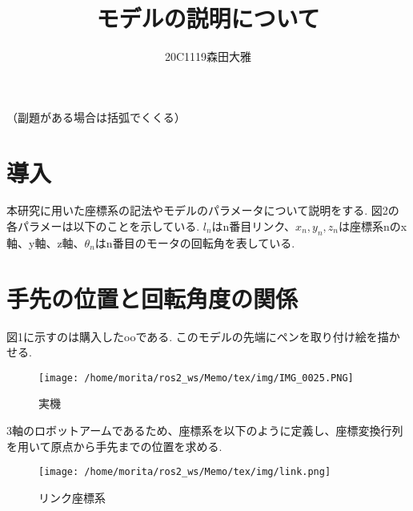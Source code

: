 \documentclass[10pt]{jarticle}
\begin{document}
    
    \makeatletter
    \title{モデルの説明について}{（副題がある場合は括弧でくくる）}
    
    \author{20C1119\hspace{.5zw}森田大雅}
    
    \makeatother
    
    \maketitle
    
  
    \section{導\hspace{2zw}入}%
	本研究に用いた座標系の記法やモデルのパラメータについて説明をする.
	図2の各パラメーは以下のことを示している.
	$l_n$はn番目リンク、$x_n, y_n, z_n$は座標系nのx軸、y軸、z軸、$\theta_n$はn番目のモータの回転角を表している.

	\section{手先の位置と回転角度の関係}
	図1に示すのは購入したooである. 
	このモデルの先端にペンを取り付け絵を描かせる.
	\begin{center}
	        \begin{figure}[!b]
	            \texttt{[image: /home/morita/ros2\_ws/Memo/tex/img/IMG\_0025.PNG]}
    	        \caption{実機}
    	        \label{fig:sample-fig}
        	\end{figure}
    	\end{center}

3軸のロボットアームであるため、座標系を以下のように定義し、座標変換行列を用いて原点から手先までの位置を求める.
 \begin{center}
    	    \begin{figure}[!b]
            \texttt{[image: /home/morita/ros2\_ws/Memo/tex/img/link.png]}
            \caption{リンク座標系}
            \label{fig:sample-fig}
        \end{figure}
    \end{center}
\end{document}
